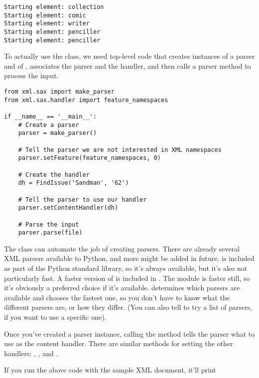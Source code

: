 \documentclass{howto}
\begin{document}
\begin{verbatim}
Starting element: collection
Starting element: comic
Starting element: writer
Starting element: penciller
Starting element: penciller
\end{verbatim}

To actually use the class, we need top-level code that creates
instances of a parser and of , associates the parser
and the handler, and then calls a parser method to process the input.

\begin{verbatim}
from xml.sax import make_parser
from xml.sax.handler import feature_namespaces

if __name__ == '__main__':
    # Create a parser
    parser = make_parser()

    # Tell the parser we are not interested in XML namespaces
    parser.setFeature(feature_namespaces, 0)

    # Create the handler
    dh = FindIssue('Sandman', '62')

    # Tell the parser to use our handler
    parser.setContentHandler(dh)

    # Parse the input
    parser.parse(file)
\end{verbatim}

The  class can automate the job of creating
parsers.  There are already several XML parsers available to Python,
and more might be added in future.   is included as
part of the Python standard library, so it's always available, but
it's also not particularly fast.  A faster version of 
is included in .  The 
module is faster still, so it's obviously a preferred choice if it's
available.   determines which parsers are
available and chooses the fastest one, so you don't have to know what
the different parsers are, or how they differ. (You can also tell
 to try a list of parsers, if you want to use a
specific one).

Once you've created a parser instance, calling the
 method tells the parser what to use as
the content handler.  There are similar methods for setting the other
handlers: , , and
.

If you run the above code with the sample XML document, it'll print
\end{document}
